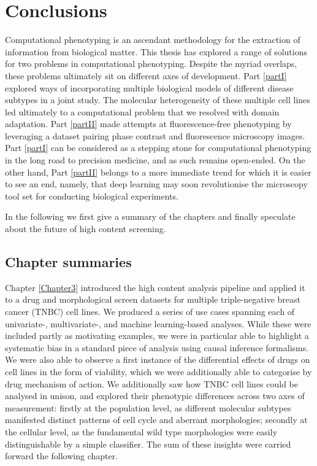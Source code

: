 
\chapter{Conclusions} %

\label{Chapter7} %

Computational phenotyping is an ascendant methodology for the extraction of information from biological matter. This thesis has explored a range of solutions for two problems in computational phenotyping. Despite the myriad overlaps, these problems ultimately sit on different axes of development. Part \ref{partI} explored ways of incorporating multiple biological models of different disease subtypes in a joint study. The molecular heterogeneity of these multiple cell lines led ultimately to a computational problem that we resolved with domain adaptation. Part \ref{partII} made attempts at fluorescence-free phenotyping by leveraging a dataset pairing phase contrast and fluorescence microscopy images. Part \ref{partI} can be considered as a stepping stone for computational phenotyping in the long road to precision medicine, and as such remains open-ended. On the other hand, Part \ref{partII} belongs to a more immediate trend for which it is easier to see an end, namely, that deep learning may soon revolutionise the microscopy tool set for conducting biological experiments.

In the following we first give a summary of the chapters and finally speculate about the future of high content screening.

\section{Chapter summaries}

Chapter \ref{Chapter3} introduced the high content analysis pipeline and applied it to a drug and morphological screen datasets for multiple triple-negative breast cancer (TNBC) cell lines. We produced a series of use cases spanning each of univariate-, multivariate-, and machine learning-based analyses. While these were included partly as motivating examples, we were in particular able to highlight a systematic bias in a standard piece of analysis using causal inference formalisms. We were also able to observe a first instance of the differential effects of drugs on cell lines in the form of viability, which we were additionally able to categorise by drug mechanism of action. We additionally saw how TNBC cell lines could be analysed in unison, and explored their phenotypic differences across two axes of measurement: firstly at the population level, as different molecular subtypes manifested distinct patterns of cell cycle and aberrant morphologies; secondly at the cellular level, as the fundamental wild type morphologies were easily distinguishable by a simple classifier. The sum of these insights were carried forward the following chapter.

